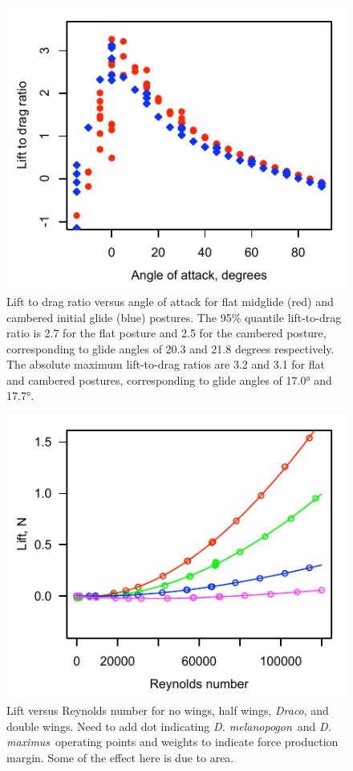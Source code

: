 \documentclass[10pt]{article}
\newcommand{\Draco}{\emph{Draco}}
\newcommand{\Dmelanopogon}{\emph{D. melanopogon}}
\newcommand{\Dmaximus}{\emph{D. maximus}}
\begin{document}
\begin{figure}
\includegraphics{figures/LD_v_aoa.pdf}
\caption{Lift to drag ratio versus angle of attack for flat midglide (red) and cambered initial glide (blue) postures.  The 95\% quantile lift-to-drag ratio is 2.7 for the flat posture and 2.5 for the cambered posture, corresponding to glide angles of 20.3 and 21.8 degrees respectively.  The absolute maximum lift-to-drag ratios are 3.2 and 3.1 for flat and cambered postures, corresponding to glide angles of \ang{17.0} and \ang{17.7}.}
\label{fig:LD_v_aoa}
\end{figure}

\begin{figure}
\includegraphics{figures/L_v_Re.pdf}
\caption{Lift versus Reynolds number for no wings, half wings, \Draco, and double wings.  Need to add dot indicating \Dmelanopogon\ and \Dmaximus\ operating points and weights to indicate force production margin.  Some of the effect here is due to area. }
\label{fig:L_v_Re}
\end{figure}
\end{document}
